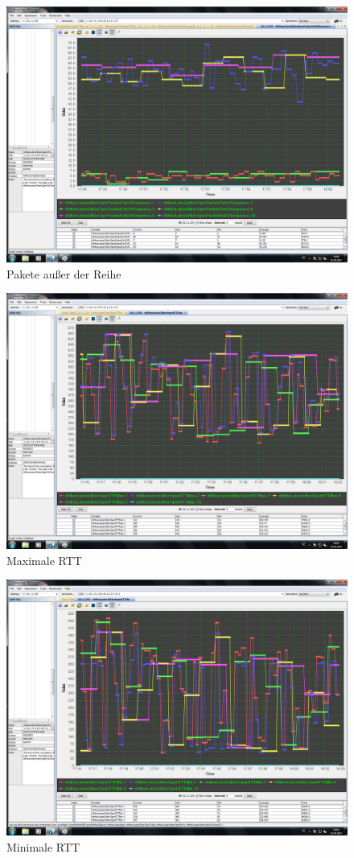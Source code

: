 \documentclass[a4paper,10pt]{scrartcl}
\begin{document}
\begin{figure}[h]
 \centering
 \includegraphics[width=\textwidth]{./Bilder/C/packet-out-of-sequence.png}
 \caption{Pakete außer der Reihe}
\end{figure}

\begin{figure}[h]
 \centering
 \includegraphics[width=\textwidth]{./Bilder/C/rtt-max.png}
 \caption{Maximale RTT}
\end{figure}

\begin{figure}[h]
 \centering
 \includegraphics[width=\textwidth]{./Bilder/C/rtt-min.png}
 \caption{Minimale RTT}
\end{figure}
\end{document}
